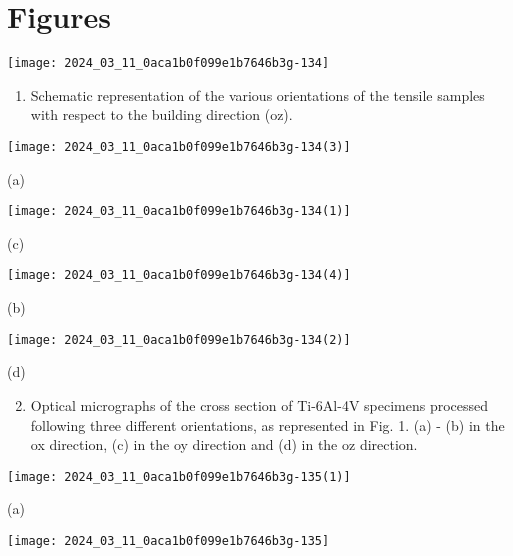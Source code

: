 \documentclass[10pt]{article}
\begin{document}
\section*{Figures}
\begin{center}
\texttt{[image: 2024\_03\_11\_0aca1b0f099e1b7646b3g-134]}
\end{center}

\begin{enumerate}
  \item Schematic representation of the various orientations of the tensile samples with respect to the building direction (oz).
\end{enumerate}

\begin{center}
\texttt{[image: 2024\_03\_11\_0aca1b0f099e1b7646b3g-134(3)]}
\end{center}

(a)

\begin{center}
\texttt{[image: 2024\_03\_11\_0aca1b0f099e1b7646b3g-134(1)]}
\end{center}

(c)

\begin{center}
\texttt{[image: 2024\_03\_11\_0aca1b0f099e1b7646b3g-134(4)]}
\end{center}

(b)

\begin{center}
\texttt{[image: 2024\_03\_11\_0aca1b0f099e1b7646b3g-134(2)]}
\end{center}

(d)

\begin{enumerate}
  \setcounter{enumi}{1}
  \item Optical micrographs of the cross section of Ti-6Al-4V specimens processed following three different orientations, as represented in Fig. 1. (a) - (b) in the ox direction, (c) in the oy direction and (d) in the oz direction.
\end{enumerate}

\begin{center}
\texttt{[image: 2024\_03\_11\_0aca1b0f099e1b7646b3g-135(1)]}
\end{center}

(a)

\begin{center}
\texttt{[image: 2024\_03\_11\_0aca1b0f099e1b7646b3g-135]}
\end{center}
\end{document}

